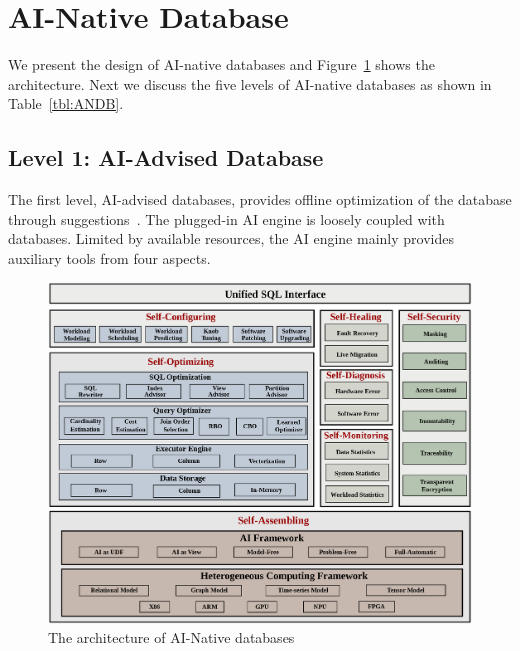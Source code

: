 

\section{AI-Native Database}
\label{sec:ANDB}

We present the design of AI-native databases and Figure~\ref{fig:ANDB} shows the architecture. Next we discuss the five levels of AI-native databases as shown in Table~\ref{tbl:ANDB}.

\subsection{Level 1: AI-Advised Database}
\label{subsec: advised}

The first level, AI-advised databases, provides offline optimization of the database through suggestions~\cite{DBLP:conf/sigmod/AkenPGZ17, DBLP:conf/vldb/qtune19, DBLP:journals/corr/abs-1802-00884}. 
The plugged-in AI engine is loosely coupled with databases. Limited by available resources, the AI engine mainly provides auxiliary tools from four aspects. 


\begin{figure}[!t]
\centering
\includegraphics[width=1.0\textwidth, height=0.89\textwidth]{figs/ANDB-arch-v3.eps}
\vspace{-1em}
\caption{The architecture of AI-Native databases}
\label{fig:ANDB}
\vspace{-1em}
\end{figure}

